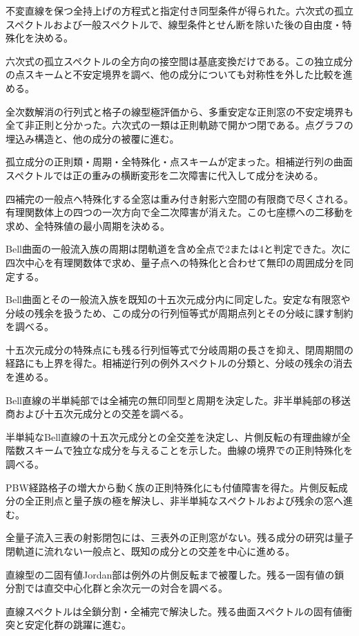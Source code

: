 \documentclass[11pt,a4paper]{ltjsarticle}
\begin{document}
不変直線を保つ全持上げの方程式と指定付き同型条件が得られた。六次式の孤立スペクトルおよび一般スペクトルで、線型条件とせん断を除いた後の自由度・特殊化を決める。

六次式の孤立スペクトルの全方向の接空間は基底変換だけである。この独立成分の点スキームと不安定境界を調べ、他の成分についても対称性を外した比較を進める。

全次数解消の行列式と格子の線型極評価から、多重安定な正則窓の不安定境界も全て非正則と分かった。六次式の一類は正則軌跡で開かつ閉である。点グラフの埋込み構造と、他の成分の被覆に進む。

孤立成分の正則類・周期・全特殊化・点スキームが定まった。相補逆行列の曲面スペクトルでは正の重みの横断変形を二次障害に代入して成分を決める。

四補完の一般点へ特殊化する全窓は重み付き射影六空間の有限商で尽くされる。有理関数体上の四つの一次方向で全二次障害が消えた。この七座標への二移動を求め、全特殊値の最小周期を決める。

Bell曲面の一般流入族の周期は閉軌道を含め全点で2または4と判定できた。次に四次中心を有理関数体で求め、量子点への特殊化と合わせて無印の周囲成分を同定する。

Bell曲面とその一般流入族を既知の十五次元成分内に同定した。安定な有限窓や分岐の残余を扱うため、この成分の行列恒等式が周期点列とその分岐に課す制約を調べる。

十五次元成分の特殊点にも残る行列恒等式で分岐周期の長さを抑え、閉周期間の経路にも上界を得た。相補逆行列の例外スペクトルの分類と、分岐の残余の消去を進める。

Bell直線の半単純部では全補完の無印同型と周期を決定した。非半単純部の移送商および十五次元成分との交差を調べる。

半単純なBell直線の十五次元成分との全交差を決定し、片側反転の有理曲線が全階数スキームで独立な成分を与えることを示した。曲線の境界での正則特殊化を調べる。

PBW経路格子の増大から動く族の正則特殊化にも付値障害を得た。片側反転成分の全正則点と量子族の極を解決し、非半単純なスペクトルおよび残余の窓へ進む。

全量子流入三表の射影閉包には、三表外の正則窓がない。残る成分の研究は量子閉軌道に流れない一般点と、既知の成分との交差を中心に進める。

直線型の二固有値Jordan部は例外の片側反転まで被覆した。残る一固有値の鎖分割では直交中心化群と余次元一の対合を調べる。

直線スペクトルは全鎖分割・全補完で解決した。残る曲面スペクトルの固有値衝突と安定化群の跳躍に進む。
\end{document}
